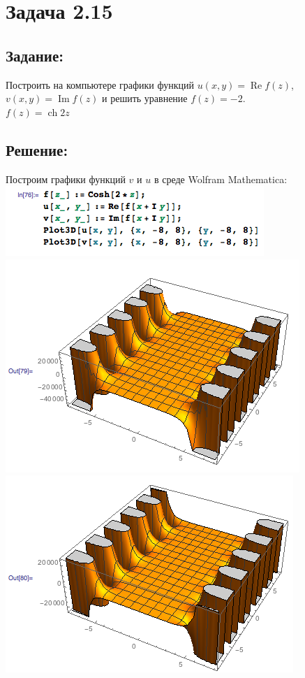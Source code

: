 \section{Задача 2.15}
\subsection{Задание:}
Построить на компьютере графики функций $ u(x,y) = \operatorname{Re} f(z) $, $ v(x,y) = \operatorname{Im} f(z) $
и решить уравнение $ f(z) = -2 $.
\\
$ f(z) = \operatorname{ch} 2z $
\subsection{Решение:}
Построим графики функций $ v $ и $ u $ в среде Wolfram Mathematica:
\\
\includegraphics[scale=0.6]{task/2_15/screen1.png}
\\
\includegraphics[scale=0.6]{task/2_15/screen2.png}
\\
\includegraphics[scale=0.6]{task/2_15/screen3.png}
